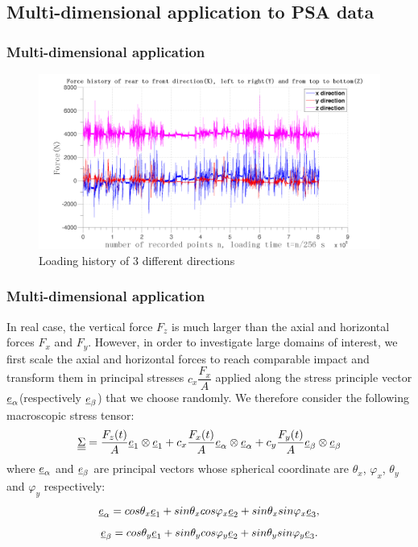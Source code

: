 \documentclass[xcolor=table]{Bredelebeamer}
\begin{document}
 \subsection{Multi-dimensional application to PSA data}
\begin{frame}
	\frametitle{Multi-dimensional application}
 \begin{figure}[!h]
 	\centering
 	\includegraphics[width=\textwidth]{figures//xyz.png} 
 	\caption{Loading history of 3 different directions}
 	\label{xyz}
 \end{figure}
\end{frame}	

\begin{frame}
	\frametitle{Multi-dimensional application}
 In real case, the vertical force $F_z$ is much larger than the axial and horizontal forces $F_x$ and $F_y$. However, in order to investigate large domains of interest, we first scale the axial and horizontal forces to reach comparable impact and transform them in principal stresses $c_x\dfrac{F_x}{A}$ applied along the stress principle vector $\uline{e}_\alpha$(respectively $\uline{e}_\beta$) that we choose randomly. We therefore consider the following macroscopic stress tensor:
 \begin{equation}
 \uline{\uline{\Sigma}}=\dfrac{F_z(t)}{A}\uline{e}_1\otimes \uline{e}_1+c_x\dfrac{F_x(t)}{A}\uline{e}_{\alpha}\otimes \uline{e}_{\alpha}+c_y\dfrac{F_y(t)}{A}\uline{e}_{\beta}\otimes \uline{e}_{\beta}
 \label{tensor1}
 \end{equation}
 where $\uline{e}_{\alpha}$  and $\uline{e}_{\beta}$ are principal vectors whose spherical coordinate are $\theta_x$, $\varphi_x$,  $\theta_y$ and $\varphi_y$ respectively:
 $$\uline{e}_{\alpha}=cos\theta_x\uline{e}_1+sin\theta_xcos\varphi_x\uline{e}_2+sin\theta_xsin\varphi_x\uline{e}_3,$$
 $$\uline{e}_{\beta}=cos\theta_y\uline{e}_1+sin\theta_ycos\varphi_y\uline{e}_2+sin\theta_ysin\varphi_y\uline{e}_3.$$


\end{frame}
\end{document}
